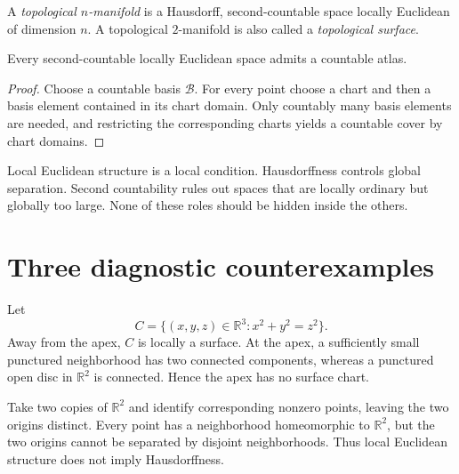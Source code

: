 \begin{definition}\label{def:vii01-topological-manifold}
A \emph{topological \(n\)-manifold} is a Hausdorff, second-countable space locally Euclidean of dimension \(n\).
A topological \(2\)-manifold is also called a \emph{topological surface}.
\end{definition}

\begin{proposition}\label{prop:vii01-countable-atlas}
Every second-countable locally Euclidean space admits a countable atlas.
\end{proposition}
\begin{proof}
Choose a countable basis \(\mathcal B\).  For every point choose a chart and then a basis element contained in its chart domain.  Only countably many basis elements are needed, and restricting the corresponding charts yields a countable cover by chart domains.
\end{proof}

\begin{remark}\label{rem:vii01-three-axioms}
Local Euclidean structure is a local condition.  Hausdorffness controls global separation.  Second countability rules out spaces that are locally ordinary but globally too large.  None of these roles should be hidden inside the others.
\end{remark}

\section{Three diagnostic counterexamples}
\begin{example}\label{ex:vii01-cone}
Let
\[
C=\{(x,y,z)\in\mathbb R^3:x^2+y^2=z^2\}.
\]
Away from the apex, \(C\) is locally a surface.  At the apex, a sufficiently small punctured neighborhood has two connected components, whereas a punctured open disc in \(\mathbb R^2\) is connected.  Hence the apex has no surface chart.
\end{example}

\begin{example}\label{ex:vii01-two-origins}
Take two copies of \(\mathbb R^2\) and identify corresponding nonzero points, leaving the two origins distinct.  Every point has a neighborhood homeomorphic to \(\mathbb R^2\), but the two origins cannot be separated by disjoint neighborhoods.  Thus local Euclidean structure does not imply Hausdorffness.
\end{example}


